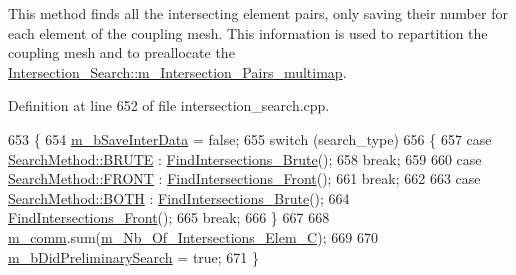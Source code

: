 This method finds all the intersecting element pairs, only saving their number for each element of the coupling mesh. This information is used to repartition the coupling mesh and to preallocate the \hyperlink{classcarl_1_1_intersection___search_a21bb47bfa3021d18b718919ad4a245d7}{Intersection\+\_\+\+Search\+::m\+\_\+\+Intersection\+\_\+\+Pairs\+\_\+multimap}. 

Definition at line 652 of file intersection\+\_\+search.\+cpp.


\begin{DoxyCode}
653     \{
654         \hyperlink{classcarl_1_1_intersection___search_a8f20721814d9dcfab34a0b6c85b88f3c}{m\_bSaveInterData} = \textcolor{keyword}{false};
655         \textcolor{keywordflow}{switch} (search\_type)
656         \{
657             \textcolor{keywordflow}{case} \hyperlink{namespacecarl_a2c9d0282cb533624e034ccc1d7b629c7a795a195e14566a465c90e47e4f389447}{SearchMethod::BRUTE} :   
      \hyperlink{classcarl_1_1_intersection___search_af8aa21969e1f71ed50877aa6b6eb147d}{FindIntersections\_Brute}();
658                             \textcolor{keywordflow}{break};
659 
660             \textcolor{keywordflow}{case} \hyperlink{namespacecarl_a2c9d0282cb533624e034ccc1d7b629c7af5458c8a9b1cd8aa10c970b4d4853bbb}{SearchMethod::FRONT} :   
      \hyperlink{classcarl_1_1_intersection___search_a69d44884067e5bb1e63711c66c9c6d89}{FindIntersections\_Front}();
661                             \textcolor{keywordflow}{break};
662 
663             \textcolor{keywordflow}{case} \hyperlink{namespacecarl_a2c9d0282cb533624e034ccc1d7b629c7a627ddde9718f452847bda05968663a7c}{SearchMethod::BOTH} :     
      \hyperlink{classcarl_1_1_intersection___search_af8aa21969e1f71ed50877aa6b6eb147d}{FindIntersections\_Brute}();
664                             \hyperlink{classcarl_1_1_intersection___search_a69d44884067e5bb1e63711c66c9c6d89}{FindIntersections\_Front}();
665                             \textcolor{keywordflow}{break};
666         \}
667 
668         \hyperlink{classcarl_1_1_intersection___search_a69fe381ecd45f4cdcb4810294aa88eaa}{m\_comm}.sum(\hyperlink{classcarl_1_1_intersection___search_af54d17052502ee0d11ec33b915e2074e}{m\_Nb\_Of\_Intersections\_Elem\_C});
669 
670         \hyperlink{classcarl_1_1_intersection___search_ab3d9729d5029e30fff786305c8aa3a01}{m\_bDidPreliminarySearch} = \textcolor{keyword}{true};
671     \}
\end{DoxyCode}
\hypertarget{classcarl_1_1_intersection___search_ada98ea0155e0d69ed41d82c2a5deb2c5}{}
